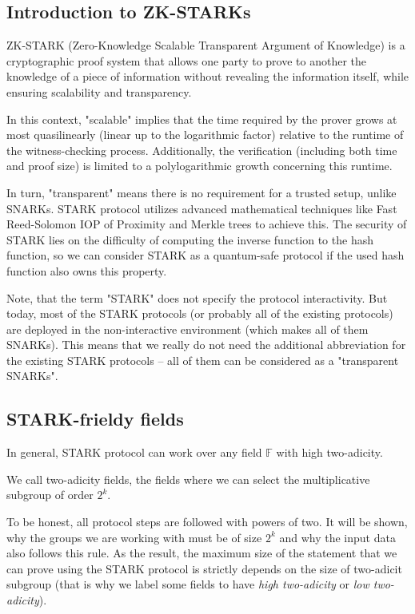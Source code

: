 \documentclass[../lecture-notes.tex]{subfiles}
\begin{document}
\subsection{Introduction to ZK-STARKs}

ZK-STARK (Zero-Knowledge Scalable Transparent Argument of Knowledge) is a cryptographic proof system that allows one party to prove to another the knowledge of a piece of information without revealing the information itself, while ensuring scalability and transparency. 

In this context, "scalable" implies that the time required by the prover grows at most quasilinearly (linear up to the logarithmic factor) relative to the runtime of the witness-checking process. Additionally, the verification (including both time and proof size) is limited to a polylogarithmic growth concerning this runtime.

In turn, "transparent" means there is no requirement for a trusted setup, unlike SNARKs. STARK protocol utilizes advanced mathematical techniques like Fast Reed-Solomon IOP of Proximity and Merkle trees to achieve this. The security of STARK lies on the difficulty of computing the inverse function to the hash function, so we can consider STARK as a quantum-safe protocol if the used hash function also owns this property.

Note, that the term "STARK" does not specify the protocol interactivity. But today, most of the STARK protocols (or probably all of the existing protocols) are deployed in the non-interactive environment (which makes all of them SNARKs). This means that we really do not need the additional abbreviation for the existing STARK protocols -- all of them can be considered as a "transparent SNARKs".

\subsection{STARK-frieldy fields}
In general, STARK protocol can work over any field $\mathbb{F}$ with high two-adicity.

\begin{definition}
    We call two-adicity fields, the fields where we can select the multiplicative subgroup of order $2^k$.
\end{definition}

To be honest, all protocol steps are followed with powers of two. It will be shown, why the groups we are working with must be of size $2^k$ and why the input data also follows this rule. As the result, the maximum size of the statement that we can prove using the STARK protocol is strictly depends on the size of two-adicit subgroup (that is why we label some fields to have \textit{high two-adicity} or \textit{low two-adicity}).
\end{document}
